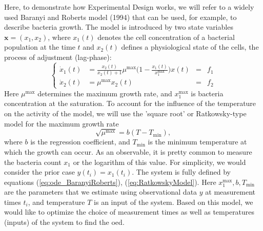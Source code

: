 \documentclass[10pt,A4paper]{article}
\newcommand{\mbx}{\mathbf{x}}
\begin{document}
Here, to demonstrate how Experimental Design works, we will refer to a widely used Baranyi and Roberts model (1994) that can be used, for example, to describe bacteria growth.
The model is introduced by two state variables $\mbx = (x_1, x_2)$, where $x_1(t)$ denotes the cell concentration of a bacterial population at the time $t$ and $x_2(t)$ defines a physiological state of the cells, the process of adjustment (lag-phase):
\begin{equation}
    \left\{
    \begin{alignat}{3}
        \dot x_1(t) &= \frac{x_2(t)}{x_2(t) + 1} \mu^\text{max} \big(1 - \frac{x_1(t)}{x_1^\text{max}}\big) x(t)  &=& f_1 \\
        \dot x_2(t) &= \mu^\text{max}  x_2(t) &=& f_2
    \end{alignat}\right.
    \label{eq:ode_BaranyiRoberts}
\end{equation}
Here $\mu^\text{max}$ determines the maximum growth rate, and $x_1^\text{max}$ is bacteria concentration at the saturation. 
To account for the influence of the temperature on the activity of the model, we will use the 'square root' or Ratkowsky-type model for the maximum growth rate
\begin{equation}
    \sqrt{\mu^\text{max}} = b (T - T_\text{min}),
    \label{eq:RatkowskyModel}
\end{equation} 
where $b$ is the regression coefficient, and $T_\text{min}$ is the minimum temperature at which the growth can occur.
As an observable, it is pretty common to measure the bacteria count $x_1$ or the logarithm of this value. 
For simplicity, we would consider the prior case $y(t_i) = x_1(t_i)$.
The system is fully defined by equations (\ref{eq:ode_BaranyiRoberts}), (\ref{eq:RatkowskyModel}).
Here $x_1^\text{max}, b, T_\text{min}$ are the parameters that we estimate using observational data $y$ at measurement times $t_i$, and temperature $T$ is an input of the system.
Based on this model, we would like to optimize the choice of measurement times as well as temperatures (inputs) of the system to find the \acl{oed}.
%
\end{document}
